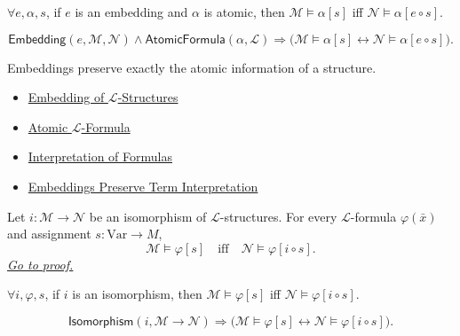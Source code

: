 \begin{remark*}
$\forall e,\alpha,s$, if $e$ is an embedding and $\alpha$ is atomic, then
$\mathcal{M}\models\alpha[s]$ iff
$\mathcal{N}\models\alpha[e\circ s]$.
\end{remark*}

\begin{remark*}
\[
\mathsf{Embedding}(e,\mathcal{M},\mathcal{N})
\land
\mathsf{AtomicFormula}(\alpha,\mathcal{L})
\Longrightarrow
\bigl(\mathcal{M}\models\alpha[s]\leftrightarrow
\mathcal{N}\models\alpha[e\circ s]\bigr).
\]
\end{remark*}

\begin{remark*}[Interpretation]
Embeddings preserve exactly the atomic information of a structure.
\end{remark*}

\begin{dependencies}
\begin{itemize}
  \item \hyperref[def:l-structure-embedding]{Embedding of $\mathcal{L}$-Structures}
  \item \hyperref[def:l-atomic-formula]{Atomic $\mathcal{L}$-Formula}
  \item \hyperref[def:formula-interpretation]{Interpretation of Formulas}
  \item \hyperref[prop:embeddings-preserve-term-interpretation]{Embeddings Preserve Term Interpretation}
\end{itemize}
\end{dependencies}

\begin{proposition}\label{prop:isomorphisms-preserve-formulas}
Let $i\colon\mathcal{M}\to\mathcal{N}$ be an isomorphism of
$\mathcal{L}$-structures. For every $\mathcal{L}$-formula $\varphi(\bar x)$
and assignment $s\colon\mathrm{Var}\to M$,
\[
  \mathcal{M}\models \varphi[s]
  \quad\text{iff}\quad
  \mathcal{N}\models \varphi[i\circ s].
\]
\hyperref[prf:isomorphisms-preserve-formulas]{\textit{Go to proof.}}
\end{proposition}

\begin{remark*}
$\forall i,\varphi,s$, if $i$ is an isomorphism, then
$\mathcal{M}\models\varphi[s]$ iff
$\mathcal{N}\models\varphi[i\circ s]$.
\end{remark*}

\begin{remark*}
\[
\mathsf{Isomorphism}(i,\mathcal{M}\to\mathcal{N})
\Longrightarrow
\bigl(\mathcal{M}\models\varphi[s]\leftrightarrow
\mathcal{N}\models\varphi[i\circ s]\bigr).
\]
\end{remark*}

